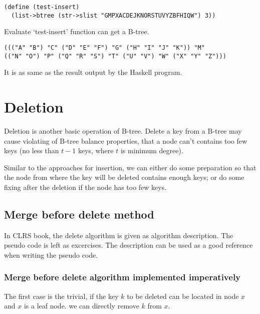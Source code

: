 \documentclass{article}
\begin{document}
\begin{lstlisting}
(define (test-insert)
  (list->btree (str->slist "GMPXACDEJKNORSTUVYZBFHIQW") 3))
\end{lstlisting}

Evaluate `test-insert' function can get a B-tree.

\begin{lstlisting}
((("A" "B") "C" ("D" "E" "F") "G" ("H" "I" "J" "K")) "M" 
(("N" "O") "P" ("Q" "R" "S") "T" ("U" "V") "W" ("X" "Y" "Z")))
\end{lstlisting}

It is as same as the result output by the Haskell program.

\section{Deletion} 

Deletion is another basic operation of B-tree. Delete a key from a
B-tree may cause violating of B-tree balance properties, that a node
can't contains too few keys (no less than $t-1$ keys, where $t$ is 
minimum degree).

Similar to the approaches for insertion, we can either do some preparation
so that the node from where the key will be deleted contains enough
keys; or do some fixing after the deletion if the node has too few keys.


\subsection{Merge before delete method} 

In CLRS book, the delete algorithm is given as algorithm description.
The pseudo code is left as excercises. The description can be used
as a good reference when writing the pseudo code.

\subsubsection{Merge before delete algorithm implemented imperatively}

The first case is the trivial, if the key $k$ to be deleted
can be located in node $x$ and $x$ is a leaf node. we can directly
remove $k$ from $x$.
\end{document}
